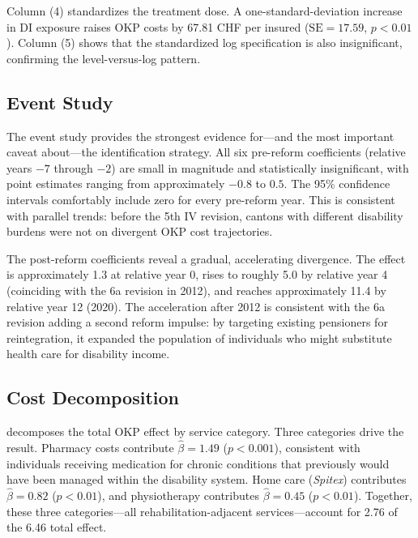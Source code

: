 \documentclass[12pt]{article}
\begin{document}
Column (4) standardizes the treatment dose. A one-standard-deviation increase in DI exposure raises OKP costs by 67.81 CHF per insured ($\text{SE} = 17.59$, $p < 0.01$). Column (5) shows that the standardized log specification is also insignificant, confirming the level-versus-log pattern.

\subsection{Event Study}

The event study provides the strongest evidence for---and the most important caveat about---the identification strategy. All six pre-reform coefficients (relative years $-7$ through $-2$) are small in magnitude and statistically insignificant, with point estimates ranging from approximately $-0.8$ to $0.5$. The 95\% confidence intervals comfortably include zero for every pre-reform year. This is consistent with parallel trends: before the 5th IV revision, cantons with different disability burdens were not on divergent OKP cost trajectories.

The post-reform coefficients reveal a gradual, accelerating divergence. The effect is approximately 1.3 at relative year 0, rises to roughly 5.0 by relative year 4 (coinciding with the 6a revision in 2012), and reaches approximately 11.4 by relative year 12 (2020). The acceleration after 2012 is consistent with the 6a revision adding a second reform impulse: by targeting existing pensioners for reintegration, it expanded the population of individuals who might substitute health care for disability income.

\subsection{Cost Decomposition}



 decomposes the total OKP effect by service category. Three categories drive the result. Pharmacy costs contribute $\hat{\beta} = 1.49$ ($p < 0.001$), consistent with individuals receiving medication for chronic conditions that previously would have been managed within the disability system. Home care (\textit{Spitex}) contributes $\hat{\beta} = 0.82$ ($p < 0.01$), and physiotherapy contributes $\hat{\beta} = 0.45$ ($p < 0.01$). Together, these three categories---all rehabilitation-adjacent services---account for 2.76 of the 6.46 total effect.
\end{document}
